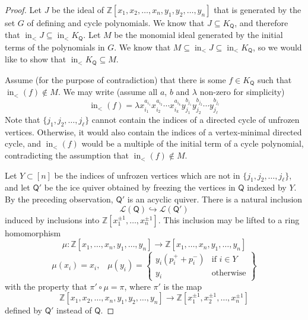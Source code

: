 \documentclass[10pt]{amsart}
\numberwithin{equation}{section}
\theoremstyle{definition}
\theoremstyle{remark}
\newcommand{\Z}{\mathbb{Z}}
\renewcommand{\L}{\mathcal{L}}%
\DeclareMathOperator{\In}{\mathrm{in}}
\newcommand{\1}{^{-1}}
\def\ZZ{\mathbb{Z}}
\def\Q{\mathsf{Q}}
\begin{document}
\begin{proof}
Let $J$ be the ideal of $\Z[x_1,x_2,\dots,x_n,y_1,y_2,\dots,y_n]$ that is generated by the set $G$ of defining and cycle polynomials. We know that $J \subseteq K_\Q$, and therefore that $\In_< J \subseteq \In_< K_\Q$. Let $M$ be the monomial ideal generated by the initial terms of the polynomials in $G$.  We know that $M \subseteq \In_< J \subseteq \In_< K_\Q$, so we would like to show that $\In_< K_\Q \subseteq M$. 

Assume (for the purpose of contradiction) that there is some $f\in K_\Q$ such that $\In_<(f)\not\in M$.  We may write
(assume all $a$, $b$ and $\lambda$ non-zero for simplicity)
\begin{equation}\label{form}
\In_<(f)= \lambda x_{i_1}^{a_{i_1}} x_{i_2}^{a_{i_2}} \cdots x_{i_k}^{a_{i_k}} y_{j_1}^{b_{j_1}} y_{j_2}^{b_{j_2}} \cdots y_{j_\ell}^{b_{j_\ell}}
\end{equation}
Note that $\{j_1,j_2,\dots,j_\ell\}$ cannot contain the indices of a directed cycle of unfrozen vertices. Otherwise, it would also contain the indices of a vertex-minimal directed cycle, and $\In_<(f)$ would be a multiple of the initial term of a cycle polynomial, contradicting the assumption that $\In_<(f)\not\in M$.
%

Let $Y\subset [n]$ be the indices of unfrozen vertices which are not in $\{j_1,j_2,\dots,j_\ell\}$, and let $\Q'$ be the ice quiver obtained by freezing the vertices in $\Q$ indexed by $Y$.  By the preceding observation, $\Q'$ is an acyclic quiver.
%
%
There is a natural inclusion
\[ \L(\Q)\hookrightarrow \L(\Q') \]
induced by inclusions into $\ZZ[x_1^{\pm1},\dots,x_n^{\pm1}]$.  This inclusion may be lifted to a ring homomorphism
\[ \mu: \ZZ[x_1,\dots,x_n,y_1,\dots,y_n]\rightarrow \ZZ[x_1,\dots,x_n,y_1,\dots,y_n]\]
\[ \mu(x_i)=x_i,\;\;\; \mu(y_i) = \left\{\begin{array}{cc}
y_i(p_i^++p_i^-) & \text{if }i\in Y \\
y_i & \text{otherwise}
\end{array}\right\}\]
with the property that $\pi'\circ \mu = \pi$, where $\pi'$ is the map
\[ \ZZ[x_1,x_2,\dots,x_n,y_1,y_2,\dots,y_n]\longrightarrow \ZZ[x_1^{\pm1},x_2^{\pm1},\dots,x_n^{\pm1} ]\]
defined by $\Q'$ instead of $\Q$.  


\end{proof}
\end{document}
